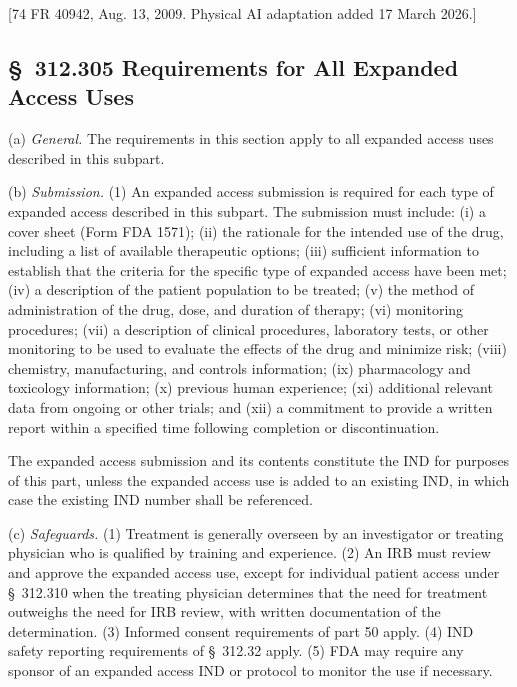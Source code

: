 \documentclass[11pt]{article}
\begin{document}
[74 FR 40942, Aug. 13, 2009. Physical AI adaptation added 17 March 2026.]

\subsection{\S~312.305 Requirements for All Expanded Access Uses}

(a) \textit{General.} The requirements in this section apply to all expanded access uses described in this subpart.

(b) \textit{Submission.} (1) An expanded access submission is required for each type of expanded access described in this subpart. The submission must include: (i) a cover sheet (Form FDA 1571); (ii) the rationale for the intended use of the drug, including a list of available therapeutic options; (iii) sufficient information to establish that the criteria for the specific type of expanded access have been met; (iv) a description of the patient population to be treated; (v) the method of administration of the drug, dose, and duration of therapy; (vi) monitoring procedures; (vii) a description of clinical procedures, laboratory tests, or other monitoring to be used to evaluate the effects of the drug and minimize risk; (viii) chemistry, manufacturing, and controls information; (ix) pharmacology and toxicology information; (x) previous human experience; (xi) additional relevant data from ongoing or other trials; and (xii) a commitment to provide a written report within a specified time following completion or discontinuation.

\begin{description}[leftmargin=0.5cm,style=sameline]
\item[(2)] The expanded access submission and its contents constitute the IND for purposes of this part, unless the expanded access use is added to an existing IND, in which case the existing IND number shall be referenced.
\end{description}

(c) \textit{Safeguards.} (1) Treatment is generally overseen by an investigator or treating physician who is qualified by training and experience. (2) An IRB must review and approve the expanded access use, except for individual patient access under \S~312.310 when the treating physician determines that the need for treatment outweighs the need for IRB review, with written documentation of the determination. (3) Informed consent requirements of part 50 apply. (4) IND safety reporting requirements of \S~312.32 apply. (5) FDA may require any sponsor of an expanded access IND or protocol to monitor the use if necessary.
\end{document}

